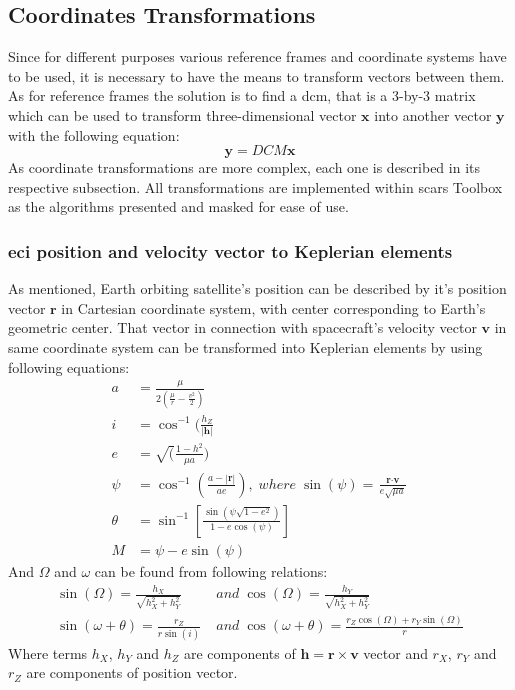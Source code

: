 \subsection{Coordinates Transformations}
    Since for different purposes various reference frames and coordinate systems have to be used, it is necessary to have the means to transform vectors between them. As for reference frames the solution is to find a \ac{dcm}, that is a 3-by-3 matrix which can be used to transform three-dimensional vector $\textbf{x}$ into another vector $\textbf{y}$ with the following equation:
    \begin{equation}
        \textbf{y} = DCM\textbf{x}
    \end{equation}
    As coordinate transformations are more complex, each one is described in its respective subsection. All transformations are implemented within \ac{scars} Toolbox as the algorithms presented and masked for ease of use.
    
    \subsubsection{\ac{eci} position and velocity vector to Keplerian elements}
        As mentioned, Earth orbiting satellite's position can be described by it's position vector $\textbf{r}$ in Cartesian coordinate system, with center corresponding to Earth's geometric center. That vector in connection with spacecraft's velocity vector $\textbf{v}$ in same coordinate system can be transformed into Keplerian elements by using following equations:
        \begin{align}
            a &= \frac{\mu}{2\left(\frac{\mu}{r}-\frac{v^2}{2}\right)} \\
            i &= \cos^{-1}(\frac{h_Z}{|\textbf{h}|} \\
            e &= \sqrt(\frac{1-h^2}{\mu a}) \\
            \psi &= \cos^{-1}\left(\frac{a-|\textbf{r}|}{ae}\right), \; where \; \sin(\psi) = \frac{\textbf{r}\cdot\textbf{v}}{e\sqrt{\mu a}} \\
            \theta &= \sin^{-1}\left[\frac{\sin(\psi \sqrt{1-e^2})}{1-e\cos(\psi)}\right] \\
            M & = \psi - e\sin(\psi)
        \end{align}
        And $\Omega$ and $\omega$ can be found from following relations:
        \begin{align}
            \sin(\Omega) = \frac{h_X}{\sqrt{h^2_X+h^2_Y}}\; & and\; \cos(\Omega) = \frac{h_Y}{\sqrt{h^2_X+h^2_Y}} \\
            \sin(\omega+\theta) = \frac{r_Z}{r\sin(i)}\; & and\; \cos(\omega+\theta) = \frac{r_Z\cos(\Omega)+r_Y\sin(\Omega)}{r}
        \end{align}
        Where terms $h_X$, $h_Y$ and $h_Z$ are components of $\textbf{h}=\textbf{r}\times \textbf{v}$ vector and $r_X$, $r_Y$ and $r_Z$ are components of position vector.
    
